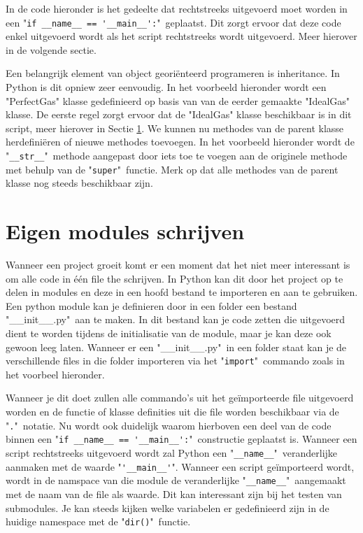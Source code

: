 \documentclass[11pt,twoside]{article}
\begin{document}
In de code hieronder is het gedeelte dat rechtstreeks uitgevoerd moet worden in een "\lstinline{if __name__ == '__main__':}"\ geplaatst. Dit zorgt ervoor dat deze code enkel uitgevoerd wordt als het script rechtstreeks wordt uitgevoerd. Meer hierover in de volgende sectie.


Een belangrijk element van object georiënteerd programeren is inheritance. In Python is dit opniew zeer eenvoudig. In het voorbeeld hieronder wordt een "PerfectGas" klasse gedefinieerd op basis van van de eerder gemaakte "IdealGas" klasse. De eerste regel zorgt ervoor dat de "IdealGas" klasse beschikbaar is in dit script, meer hierover in Sectie \ref{sec:Eigen modules schrijven}. We kunnen nu methodes van de parent klasse herdefiniëren of nieuwe methodes toevoegen. In het voorbeeld hieronder wordt de "\lstinline{__str__}"\ methode aangepast door iets toe te voegen aan de originele methode met behulp van de "\lstinline{super}"\ functie. Merk op dat alle methodes van de parent klasse nog steeds beschikbaar zijn.

	
 	\section{Eigen modules schrijven}
 	\label{sec:Eigen modules schrijven}
Wanneer een project groeit komt er een moment dat het niet meer interessant is om alle code in één file the schrijven. In Python kan dit door het project op te delen in modules en deze in een hoofd bestand te importeren en aan te gebruiken. Een python module kan je definieren door in een folder een bestand "\textsf{\_\_init\_\_.py}"\ aan te maken. In dit bestand kan je code zetten die uitgevoerd dient te worden tijdens de initialisatie van de module, maar je kan deze ook gewoon leeg laten. Wanneer er een "\textsf{\_\_init\_\_.py}"\ in een folder staat kan je de verschillende files in die folder importeren via het "\lstinline{import}"\ commando zoals in het voorbeel hieronder.

Wanneer je dit doet zullen alle commando's uit het geïmporteerde file uitgevoerd worden en de functie of klasse definities uit die file worden beschikbaar via de "\lstinline{.}"\ notatie. Nu wordt ook duidelijk waarom hierboven een deel van de code binnen een "\lstinline{if __name__ == '__main__':}"\ constructie geplaatst is. Wanneer een script rechtstreeks uitgevoerd wordt zal Python een "\lstinline{__name__}"\ veranderlijke aanmaken met de waarde "\lstinline{'__main__'}". Wanneer een script geïmporteerd wordt, wordt in de namspace van die module de veranderlijke "\lstinline{__name__}"\ aangemaakt met de naam van de file als waarde. Dit kan interessant zijn bij het testen van submodules. Je kan steeds kijken welke variabelen er gedefinieerd zijn in de huidige namespace met de "\lstinline{dir()}"\ functie.
\end{document}
